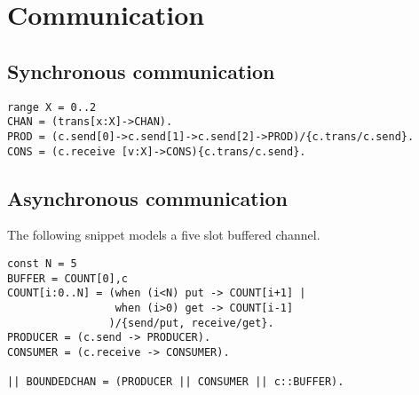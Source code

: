 \documentclass[11pt]{article}
\begin{document}
\section{Communication}
\label{sec-3}
\subsection{Synchronous communication}
\label{sec-3-1}
\begin{verbatim}
range X = 0..2
CHAN = (trans[x:X]->CHAN).
PROD = (c.send[0]->c.send[1]->c.send[2]->PROD)/{c.trans/c.send}.
CONS = (c.receive [v:X]->CONS){c.trans/c.send}.
\end{verbatim}

\subsection{Asynchronous communication}
\label{sec-3-2}
The following snippet models a five slot buffered channel.
\begin{verbatim}
const N = 5
BUFFER = COUNT[0],c
COUNT[i:0..N] = (when (i<N) put -> COUNT[i+1] |
                 when (i>0) get -> COUNT[i-1]
                )/{send/put, receive/get}.
PRODUCER = (c.send -> PRODUCER).
CONSUMER = (c.receive -> CONSUMER).

|| BOUNDEDCHAN = (PRODUCER || CONSUMER || c::BUFFER).
\end{verbatim}
\end{document}
